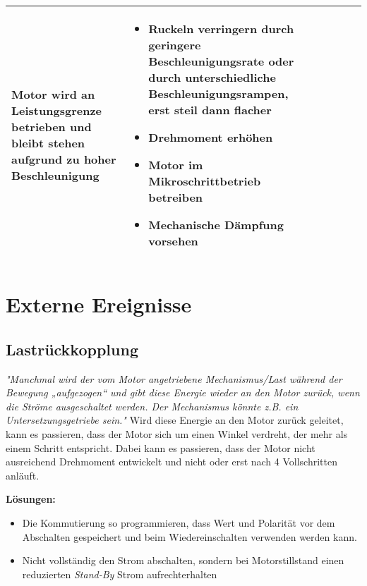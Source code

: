 {{{{\begin{center}
\begin{tabularx}{\textwidth}{|X|X|X|X|X|X|}
		Motor wird an Leistungsgrenze betrieben und bleibt stehen aufgrund zu hoher Beschleunigung & 
		\begin{itemize} 
			\item {Ruckeln verringern durch geringere Beschleunigungsrate oder durch unterschiedliche Beschleunigungsrampen, erst steil dann flacher} 
			\item {Drehmoment erhöhen} 
			\item {Motor im Mikroschrittbetrieb betreiben} 
			\item {Mechanische Dämpfung vorsehen} 
		\end{itemize}	 \\	\hline
	\end{tabularx}
\end{center}



\section{Externe Ereignisse}
\subsection{Lastrückkopplung}
\textit{"Manchmal wird der vom Motor angetriebene Mechanismus/Last während der Bewegung „aufgezogen“ und gibt diese Energie wieder an den Motor zurück, wenn die Ströme ausgeschaltet werden. Der Mechanismus könnte z.B. ein Untersetzungsgetriebe sein."}\cite{FaulhaberDriveSystems.2020} 
Wird diese Energie an den Motor zurück geleitet, kann es passieren, dass der Motor sich um einen Winkel verdreht, der mehr als einem Schritt entspricht. Dabei kann es passieren, dass der Motor nicht ausreichend Drehmoment entwickelt und nicht oder erst nach 4 Vollschritten anläuft. \cite{FaulhaberDriveSystems.2020}

\textbf{Lösungen:}
\begin{itemize}
	\item Die Kommutierung so programmieren, dass Wert und Polarität vor dem Abschalten gespeichert und beim Wiedereinschalten verwenden werden kann. 
	\item Nicht vollständig den Strom abschalten, sondern bei Motorstillstand einen reduzierten \textit{Stand-By} Strom aufrechterhalten
\end{itemize}

}}}}
